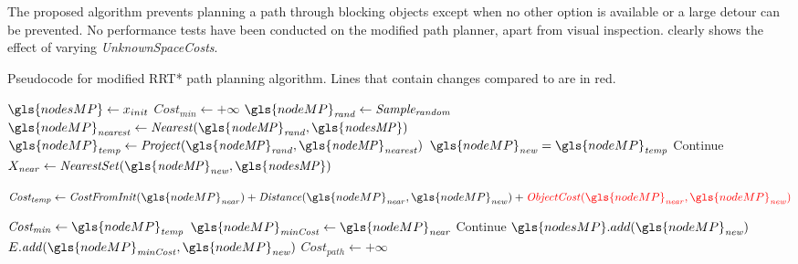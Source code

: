 The proposed algorithm prevents planning a path through blocking objects except when no other option is available or a large detour can be prevented. No performance tests have been conducted on the modified path planner, apart from visual inspection.  clearly shows the effect of varying \textit{UnknownSpaceCosts}.


\begin{algorithm}[H]
  \caption{Pseudocode for modified \ac{RRT*} path planning algorithm. Lines that contain changes compared to  are in red.}%
  \label{pseudocode:modified_proposed_rrt_star}
  \begin{algorithmic}[1]

    \State $\gls{nodesMP} \leftarrow x_{init}$
      \State $Cost_\mathit{min} \leftarrow +\infty$ 
      \State $\gls{nodeMP}_\mathit{rand} \leftarrow \mathit{Sample_{random}}$
      \State $\gls{nodeMP}_\mathit{nearest} \leftarrow \mathit{Nearest(\gls{nodeMP}_{rand}, \gls{nodesMP})}$
      \State $\gls{nodeMP}_\mathit{temp} \leftarrow \mathit{Project(\gls{nodeMP}_{rand}, \gls{nodeMP}_{nearest})}$
      \State $\gls{nodeMP}_\mathit{new} = \gls{nodeMP}_\mathit{temp}$
      \Else
      \State Continue
      \EndIf
      \State $X_\mathit{near} \leftarrow \mathit{NearestSet(\gls{nodeMP}_{new}, \gls{nodesMP})}$ 

    \State $\mathit{Cost_{temp}} \leftarrow \mathit{CostFromInit}(\gls{nodeMP}_\mathit{near}) + \mathit{Distance}(\gls{nodeMP}_\mathit{near}, \gls{nodeMP}_\mathit{new}) + \textcolor{red}{\mathit{ObjectCost}(\gls{nodeMP}_\mathit{near}, \gls{nodeMP}_\mathit{new})}$

      \State $\mathit{Cost_{min}} \leftarrow \gls{nodeMP}_\mathit{temp}$
      \State $\gls{nodeMP}_\mathit{minCost} \leftarrow \gls{nodeMP}_\mathit{near}$
      \EndIf
      \EndFor
      \State Continue
      \Else
      \State $\gls{nodesMP}.add(\gls{nodeMP}_\mathit{new})$
      \State $E.\mathit{add}(\gls{nodeMP}_\mathit{minCost}, \gls{nodeMP}_\mathit{new})$
      \EndIf
      \State $\mathit{Cost_{path}} \leftarrow +\infty$ 


\end{algorithmic}
\end{algorithm}
